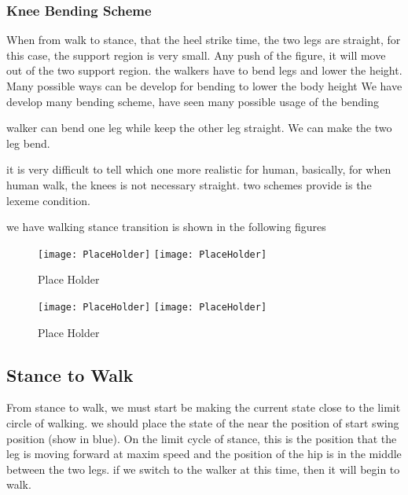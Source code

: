 \subsubsection*{Knee Bending Scheme}
When from walk to stance, that the heel strike time, the two legs are straight, for this case, the support region is very small.
Any push of the figure, it will move out of the two support region.
the walkers have to bend legs and lower the height.
Many possible ways can be develop for bending to lower the body height
We have develop many bending scheme, have seen many possible usage of the bending

\begin{itemize}
		walker can bend one leg while keep the other leg straight.
		We can make the two leg bend.
\end{itemize}

it is very difficult to tell which one more realistic for human, basically, for when human walk, the knees is not necessary straight.
two schemes provide is the lexeme condition.

we have walking stance transition is shown in the following figures

\begin{figure}[!htbp]
  \begin{center}
    \leavevmode
    \ifpdf
      \texttt{[image: PlaceHolder]}
    \else
      \texttt{[image: PlaceHolder]}
    \fi
    \caption{Place Holder}
    \label{fig:walkstancestraight}
\end{center}
\end{figure}

\begin{figure}[!htbp]
  \begin{center}
    \leavevmode
    \ifpdf
      \texttt{[image: PlaceHolder]}
    \else
      \texttt{[image: PlaceHolder]}
    \fi
    \caption{Place Holder}
    \label{fig:walkstancebend}
\end{center}
\end{figure}

\subsection{Stance to Walk}
From stance to walk, we must start be making the current state close to the limit circle of walking.
we should place the state of the near the position of start swing position (show in blue).
On the limit cycle of stance, this is the position that the leg is moving forward at maxim speed and the position of the hip is in the middle between the two legs.
if we switch to the walker at this time, then it will begin to walk.



